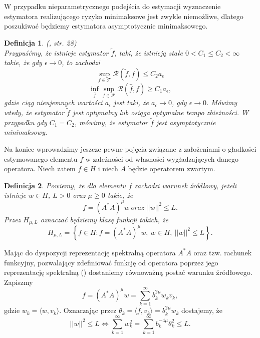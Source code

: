 \documentclass{mwart}
\newtheorem{df}{Definicja}
\begin{document}
W przypadku nieparametrycznego podejścia do estymacji wyznaczenie estymatora realizującego ryzyko minimaksowe jest zwykle niemożliwe, dlatego poszukiwać będziemy estymatora asymptotycznie minimaksowego. 
\begin{df}(\cite{iphde}, str. 28)\\
Przypuśćmy, że istnieje estymator $\tilde{f}$, taki, że istnieją stałe $0<C_1\leq C_2<\infty$ takie, że gdy $\epsilon\to 0$, to zachodzi 
\begin{displaymath}
\sup_{f\in \mathcal{F}}\mathcal{R}(\tilde{f},f)\leq C_2a_{\epsilon}
\end{displaymath}
\begin{displaymath}
\inf_{\hat{f}}\sup_{f\in \mathcal{F}}\mathcal{R}(\hat{f},f)\geq C_1a_{\epsilon},
\end{displaymath}
gdzie ciąg nieujemnych wartości $a_{\epsilon}$ jest taki, że $a_{\epsilon}\to 0$, gdy $\epsilon\to 0$.
Mówimy wtedy, że estymator $\tilde{f}$ jest optymalny lub osiąga optymalne tempo zbieżności. W przypadku gdy $C_1=C_2$, mówimy, że estymator $\tilde{f}$ jest asymptotycznie minimaksowy.
\end{df}
Na koniec wprowadzimy jeszcze pewne pojęcia związane z założeniami o gładkości estymowanego elementu $f$ w zależności od własności wygładzających danego operatora. Niech zatem $f\in H$ i niech $A$ będzie operatorem zwartym. 
\begin{df}
Powiemy, że dla elementu $f$ zachodzi warunek źródłowy, jeżeli istnieje $w\in H$, $L>0$ oraz $\mu\geq 0$ takie, że
\begin{displaymath}
f=(A^*A)^{\mu}w\ oraz\ ||w||^2\leq L.
\end{displaymath}
Przez $H_{\mu,L}$ oznaczać będziemy klasę funkcji 
takich, że
\begin{displaymath}
H_{\mu,L}=\left\{f\in H\colon f=(A^*A)^{\mu}w,\ w\in H,\ ||w||^2\leq L\right\}.
\end{displaymath}
\end{df}
Mając do dyspozycji reprezentację spektralną operatora $A^*A$ oraz tzw. rachunek funkcyjny, pozwalający zdefiniować funkcję od operatora poprzez jego reprezentację spektralną (\cite{hindus}) dostaniemy równoważną postać warunku źródłowego. Zapiszmy
\begin{displaymath}
f=(A^*A)^{\mu}w=\sum_{k=1}^{\infty}b_k^{2\mu}w_kv_k,
\end{displaymath}
gdzie $w_k=\langle w,v_k\rangle$. Oznaczając przez $\theta_k=\langle f,v_k\rangle =b_k^{2\mu}w_k$ dostajemy, że 
\begin{displaymath}
||w||^2\leq L\Longleftrightarrow \sum_{k=1}^{\infty}w_k^2=\sum_{k=1}^{\infty}b_k^{-4\mu}\theta_k^2\leq L.
\end{displaymath}
\end{document}

